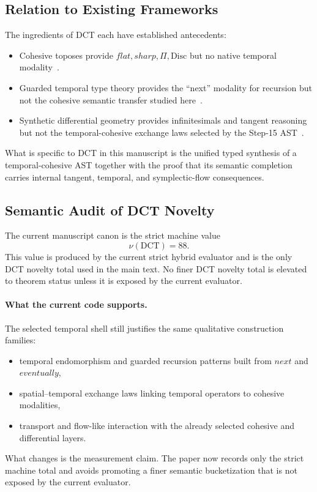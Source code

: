 \documentclass[11pt,a4paper]{article}
\def\flat{flat}%
\def\sharp{sharp}%
\def\bigcirc{next}%
\def\Diamond{eventually}%
\theoremstyle{plain}
\theoremstyle{definition}
\theoremstyle{remark}
\newcommand{\Disc}{\mathrm{Disc}}
\begin{document}
\subsection{Relation to Existing Frameworks}

The ingredients of DCT each have established antecedents:
\begin{itemize}[nosep]
    \item Cohesive toposes provide $\flat,\sharp,\Pi,\Disc$ but no native temporal modality~\cite{lawvere,schreiber}.
    \item Guarded temporal type theory provides the ``next'' modality for recursion but not the cohesive semantic transfer studied here~\cite{nakano}.
    \item Synthetic differential geometry provides infinitesimals and tangent reasoning but not the temporal-cohesive exchange laws selected by the Step-15 AST~\cite{kock}.
\end{itemize}
What is specific to DCT in this manuscript is the unified typed synthesis of a temporal-cohesive AST together with the proof that its semantic completion carries internal tangent, temporal, and symplectic-flow consequences.

\subsection{Semantic Audit of DCT Novelty}
\label{tab:nu-audit}

The current manuscript canon is the strict machine value
\[
  \nu(\text{DCT}) = 88.
\]
This value is produced by the current strict hybrid evaluator and is the only DCT novelty total used in the main text.
No finer DCT novelty total is elevated to theorem status unless it is exposed by the current evaluator.

\paragraph{What the current code supports.}
The selected temporal shell still justifies the same qualitative construction families:
\begin{itemize}[nosep]
    \item temporal endomorphism and guarded recursion patterns built from $\bigcirc$ and $\Diamond$,
    \item spatial--temporal exchange laws linking temporal operators to cohesive modalities,
    \item transport and flow-like interaction with the already selected cohesive and differential layers.
\end{itemize}
What changes is the measurement claim.
The paper now records only the strict machine total and avoids promoting a finer semantic bucketization that is not exposed by the current evaluator.
\end{document}
